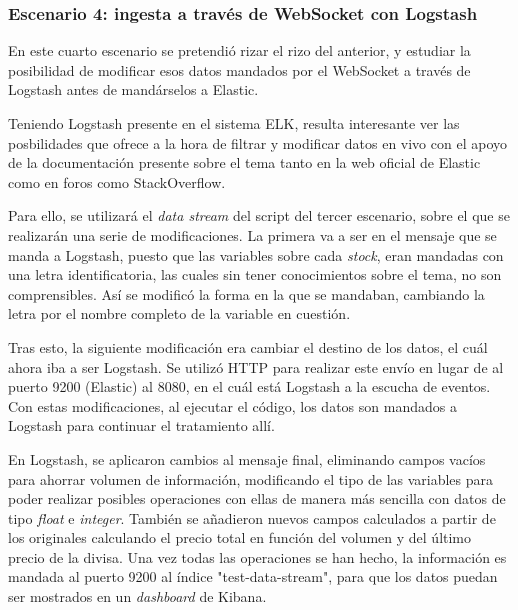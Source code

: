 \paragraph{ }
\paragraph{ }
\paragraph{ }
\paragraph{ }

\subsubsection{Escenario 4: ingesta a través de WebSocket con Logstash}

En este cuarto escenario se pretendió rizar el rizo del anterior, y estudiar la posibilidad de modificar esos datos mandados por el WebSocket a través de Logstash antes de mandárselos a Elastic.

Teniendo Logstash presente en el sistema ELK, resulta interesante ver las posbilidades que ofrece a la hora de filtrar y modificar datos en vivo con el apoyo de la documentación presente sobre el tema tanto en la web oficial de Elastic como en foros como StackOverflow.

Para ello, se utilizará el \textit{data stream} del script del tercer escenario, sobre el que se realizarán una serie de modificaciones. La primera va a ser en el mensaje que se manda a Logstash, puesto que las variables sobre cada \textit{stock}, eran mandadas con una letra identificatoria, las cuales sin tener conocimientos sobre el tema, no son comprensibles. Así se modificó la forma en la que se mandaban, cambiando la letra por el nombre completo de la variable en cuestión. 

Tras esto, la siguiente modificación era cambiar el destino de los datos, el cuál ahora iba a ser Logstash. Se utilizó HTTP para realizar este envío en lugar de al puerto 9200 (Elastic) al 8080, en el cuál está Logstash a la escucha de eventos. Con estas modificaciones, al ejecutar el código, los datos son mandados a Logstash para continuar el tratamiento allí.

En Logstash, se aplicaron cambios al mensaje final, eliminando campos vacíos para ahorrar volumen de información, modificando el tipo de las variables para poder realizar posibles operaciones con ellas de manera más sencilla con datos de tipo \textit{float} e \textit{integer}. También se añadieron nuevos campos calculados a partir de los originales calculando el precio total en función del volumen y del último precio de la divisa. Una vez todas las operaciones se han hecho, la información es mandada al puerto 9200 al índice "test-data-stream", para que los datos puedan ser mostrados en un \textit{dashboard} de Kibana. 

